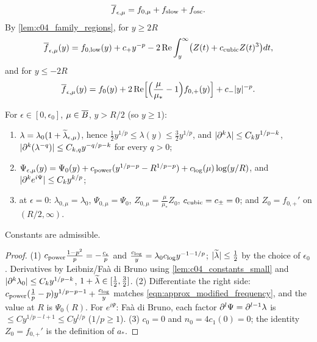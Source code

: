 \begin{definition}
  \begin{equation}\label{eqn:approx_family_definition}
    \overline{f}_{\epsilon,\mu}=f_{0,\mu}+f_{\textup{slow}}+f_{\textup{osc}} .
  \end{equation}
  By \cref{lem:c04_family_regions}, for $y\ge2R$
  \begin{equation}\label{eqn:approx_family_positive}
    \overline{f}_{\epsilon,\mu}(y)=f_{0,\textup{low}}(y)+c_+y^{-p}-2\operatorname{Re}\int_y^\infty\bigl(Z(t)+c_{\textup{cubic}}Z(t)^3\bigr)dt,
  \end{equation}
  and for $y\le-2R$
  \begin{equation}\label{eqn:approx_family_negative}
    \overline{f}_{\epsilon,\mu}(y)=f_0(y)+2\operatorname{Re}\Bigl[\Bigl(\frac\mu{\mu_*}-1\Bigr)f_{0,+}(y)\Bigr]+c_-|y|^{-p}.
  \end{equation}
\end{definition}

\begin{lemma}
  \label{lem:c04_phase_basic}
  For $\epsilon\in[0,\epsilon_0]$, $\mu\in\overline{B}$, $y>R/2$ (so $y\ge1$):
  \begin{enumerate}
    \item $\lambda=\lambda_0(1+\widetilde{\lambda}_{\epsilon,\mu})$, hence $\frac12y^{1/p}\le\lambda(y)\le\frac32y^{1/p}$, and $|\partial^k\lambda|\le C_ky^{1/p-k}$,
      $|\partial^k(\lambda^{-q})|\le C_{k,q}y^{-q/p-k}$ for every $q>0$;
    \item $\Psi_{\epsilon,\mu}(y)=\Psi_0(y)+c_{\textup{power}}(y^{1/p-p}-R^{1/p-p})+c_{\textup{log}}(\mu)\log(y/R)$, and $|\partial^k e^{i\Psi}|\le C_ky^{k/p}$;
    \item at $\epsilon=0$: $\lambda_{0,\mu}=\lambda_0$, $\Psi_{0,\mu}=\Psi_0$, $Z_{0,\mu}=\frac\mu{\mu_*}Z_0$, $c_{\textup{cubic}}=c_\pm=0$; and
      $Z_0=f_{0,+}'$ on $(R/2,\infty)$.
  \end{enumerate}
  Constants are admissible.
\end{lemma}
\begin{proof}
  (1) $c_{\textup{power}}\frac{1-p^2}p=-\frac{c_\epsilon}p$ and $\frac{c_{\textup{log}}}y=\lambda_0c_{\textup{log}}y^{-1-1/p}$; $|\widetilde{\lambda}|\le\frac12$ by the
  choice of $\epsilon_0$. Derivatives by Leibniz/Faà di Bruno using \cref{lem:c04_constants_small} and $|\partial^k\lambda_0|\le C_ky^{1/p-k}$,
  $1+\widetilde{\lambda}\in[\frac12,\frac32]$. (2) Differentiate the right side: $c_{\textup{power}}(\frac1p-p)y^{1/p-p-1}+\frac{c_{\textup{log}}}y$ matches
  \eqref{eqn:approx_modified_frequency}, and the value at $R$ is $\Psi_0(R)$. For $e^{i\Psi}$: Faà di Bruno, each factor $\partial^l\Psi=\partial^{l-1}\lambda$
  is $\le Cy^{1/p-l+1}\le Cy^{l/p}$ ($1/p\ge1$). (3) $c_0=0$ and $n_0=4c_1(0)=0$; the identity $Z_0=f_{0,+}'$ is the definition of $a_*$.
\end{proof}

